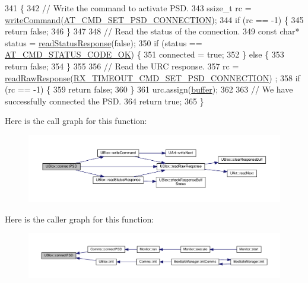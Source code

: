 \begin{DoxyCode}
341 \{
342     \textcolor{comment}{// Write the command to activate PSD.}
343     ssize\_t rc = \hyperlink{class_u_blox_af604d1897a66192bf1c2a11997f2634d}{writeCommand}(\hyperlink{_u_blox_8cpp_a4a218a894fbc18e33dcf027485c060cb}{AT\_CMD\_SET\_PSD\_CONNECTION});
344     \textcolor{keywordflow}{if} (rc == -1) \{
345         \textcolor{keywordflow}{return} \textcolor{keyword}{false};
346     \}
347 
348     \textcolor{comment}{// Read the status of the connection.}
349     \textcolor{keyword}{const} \textcolor{keywordtype}{char}* status = \hyperlink{class_u_blox_a4eaca5b1b1c4b5b6f6164b220dd43e0b}{readStatusResponse}(\textcolor{keyword}{false});
350     \textcolor{keywordflow}{if} (status == \hyperlink{_u_blox_8cpp_a6ebc1682eb6b9964fccb4a61688ff307}{AT\_CMD\_STATUS\_CODE\_OK}) \{
351         connected = \textcolor{keyword}{true};
352     \} \textcolor{keywordflow}{else} \{
353         \textcolor{keywordflow}{return} \textcolor{keyword}{false};
354     \}
355 
356     \textcolor{comment}{// Read the URC response.}
357     rc = \hyperlink{class_u_blox_ab4a7ab4b8922d91e23f273ae160c1bed}{readRawResponse}(\hyperlink{_u_blox_8cpp_a9acf8a3c149e89cfa0d456905a07a50b}{RX\_TIMEOUT\_CMD\_SET\_PSD\_CONNECTION})
      ;
358     \textcolor{keywordflow}{if} (rc == -1) \{
359         \textcolor{keywordflow}{return} \textcolor{keyword}{false};
360     \}
361     urc.assign(\hyperlink{class_u_blox_a6ca4b90f3dc4e856181dce1ebda6f82c}{buffer});
362 
363     \textcolor{comment}{// We have successfully connected the PSD.}
364     \textcolor{keywordflow}{return} \textcolor{keyword}{true};
365 \}
\end{DoxyCode}
Here is the call graph for this function\+:
\nopagebreak
\begin{figure}[H]
\begin{center}
\leavevmode
\includegraphics[width=350pt]{da/df6/class_u_blox_ac250bd4aea14e09b3a2595c2b8eda18a_cgraph}
\end{center}
\end{figure}
Here is the caller graph for this function\+:
\nopagebreak
\begin{figure}[H]
\begin{center}
\leavevmode
\includegraphics[width=350pt]{da/df6/class_u_blox_ac250bd4aea14e09b3a2595c2b8eda18a_icgraph}
\end{center}
\end{figure}
\mbox{\label{class_u_blox_ade30654ab2eab43d322dc6b516866401}} 
